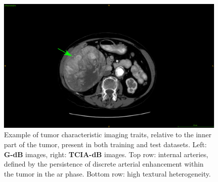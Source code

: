 \documentclass[]{article}
\newcommand{\lmttfont}[1]{{\fontfamily{lmtt}\selectfont #1}}
\begin{document}
\begin{figure}[!ht]
\begin{minipage}{0.45\linewidth}
	\end{minipage} \hspace{-0.1cm}
	\begin{minipage}{0.45\linewidth}
		\includegraphics[width=\linewidth]{../Contributions/images/ImagingTraits/ResizeTCIA_texturalHeterogeneity}
	\end{minipage}
	\caption{Example of tumor characteristic imaging traits, relative to the inner part of the tumor, present in both training and test datasets. Left: \textbf{\lmttfont{G-dB}} images, right: \textbf{\lmttfont{TCIA-dB}} images. Top row: internal arteries, defined by the persistence of discrete arterial enhancement within the tumor in the \ac{ar} phase. Bottom row: high textural heterogeneity.}
	\label{fig:InterDb_imagingTraits2}
\end{figure}
\end{document}
